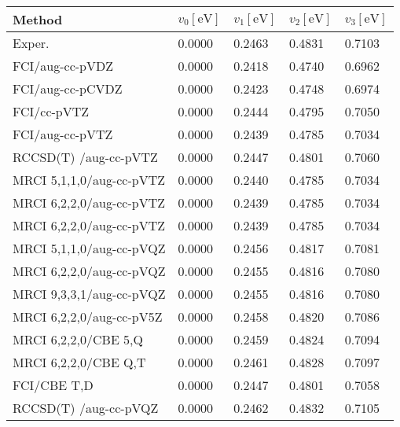 
\begin{tabular}{lllll}
\toprule
Method & $v_0 [\mathrm{eV}]$ & $v_1 [\mathrm{eV}]$ & $v_2 [\mathrm{eV}]$ & $v_3[\mathrm{eV}]$ \\ \midrule
    Exper. & 0.0000 & 0.2463 & 0.4831 & 0.7103 \\
\midrule
FCI/aug-cc-pVDZ & 0.0000 & 0.2418 & 0.4740 & 0.6962\\
FCI/aug-cc-pCVDZ & 0.0000 & 0.2423 & 0.4748 & 0.6974\\
FCI/cc-pVTZ & 0.0000 & 0.2444 & 0.4795 & 0.7050\\
FCI/aug-cc-pVTZ & 0.0000 & 0.2439 & 0.4785 & 0.7034\\
RCCSD(T) /aug-cc-pVTZ & 0.0000 & 0.2447 & 0.4801 & 0.7060\\
MRCI 5,1,1,0/aug-cc-pVTZ & 0.0000 & 0.2440 & 0.4785 & 0.7034\\
MRCI 6,2,2,0/aug-cc-pVTZ & 0.0000 & 0.2439 & 0.4785 & 0.7034\\
MRCI 6,2,2,0/aug-cc-pVTZ & 0.0000 & 0.2439 & 0.4785 & 0.7034\\
MRCI 5,1,1,0/aug-cc-pVQZ & 0.0000 & 0.2456 & 0.4817 & 0.7081\\
MRCI 6,2,2,0/aug-cc-pVQZ & 0.0000 & 0.2455 & 0.4816 & 0.7080\\
MRCI 9,3,3,1/aug-cc-pVQZ & 0.0000 & 0.2455 & 0.4816 & 0.7080\\
MRCI 6,2,2,0/aug-cc-pV5Z & 0.0000 & 0.2458 & 0.4820 & 0.7086\\
MRCI 6,2,2,0/CBE 5,Q & 0.0000 & 0.2459 & 0.4824 & 0.7094\\
MRCI 6,2,2,0/CBE Q,T & 0.0000 & 0.2461 & 0.4828 & 0.7097\\
FCI/CBE T,D & 0.0000 & 0.2447 & 0.4801 & 0.7058\\
RCCSD(T) /aug-cc-pVQZ & 0.0000 & 0.2462 & 0.4832 & 0.7105\\
\bottomrule
\end{tabular}
